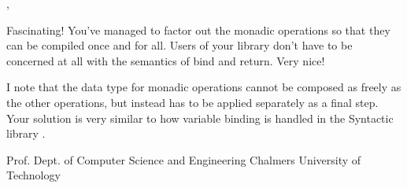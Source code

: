 \vspace{5mm} 

\noindent\colorbox{light-gray}{
\begin{minipage}[]{0.9\linewidth}
\noindent 
\studname{},
\newline

Fascinating! You've managed to factor out the monadic operations so
that they can be compiled once and for all. Users of your library
don't have to be concerned at all with the semantics of bind and return.
Very nice!
\newline

\noindent 
I note that the data type for monadic operations cannot be composed as
freely as the other operations, but instead has to be applied
separately as a final step. Your
solution is very similar to how variable binding is handled in the
Syntactic library \cite{syntactic}.
\newline \newline

\noindent Prof. \docname{}
\newline
\noindent Dept. of Computer Science and Engineering \newline
\noindent Chalmers University of Technology 
\end{minipage} 
}







